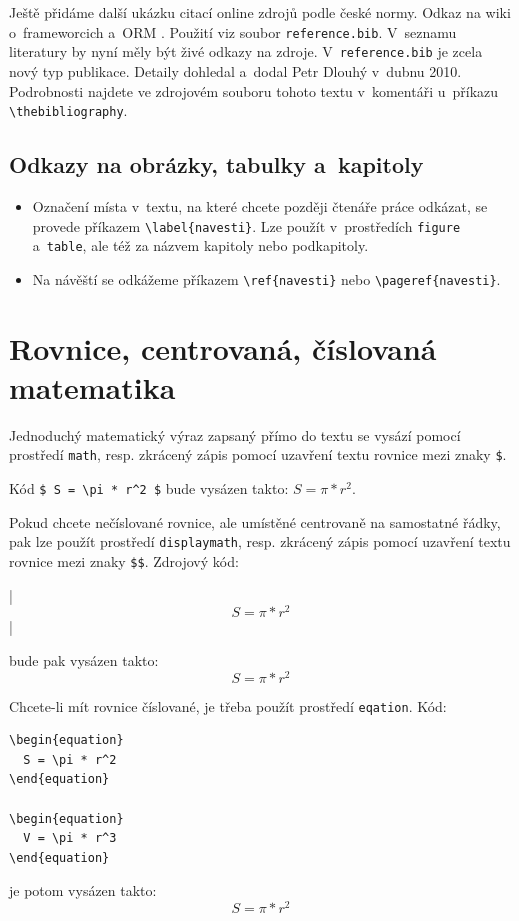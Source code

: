 \documentclass[11pt,twoside,a4paper]{book}
\begin{document}
Ještě přidáme další ukázku citací online zdrojů podle české normy. Odkaz na wiki o~frameworcich \cite{wiki:framework}
a~ORM \cite{wiki:orm}. Použití viz soubor \verb|reference.bib|. V~seznamu literatury by nyní měly být živé odkazy na
zdroje. V~\verb|reference.bib| je zcela nový typ publikace. Detaily dohledal a~dodal Petr Dlouhý v~dubnu 2010.
Podrobnosti najdete ve zdrojovém souboru tohoto textu v~komentáři u~příkazu \verb|\thebibliography|.

\subsection{Odkazy na obrázky, tabulky a~kapitoly}
\begin{itemize}
\item Označení místa v~textu, na které chcete později čtenáře práce odkázat, se provede příkazem \verb|\label{navesti}|.
Lze použít v~prostředích \verb|figure| a~\verb|table|, ale též za názvem kapitoly nebo podkapitoly.
\item Na návěští se odkážeme příkazem \verb|\ref{navesti}| nebo \verb|\pageref{navesti}|.
\end{itemize}

\section{Rovnice, centrovaná, číslovaná matematika}
Jednoduchý matematický výraz zapsaný přímo do textu se vysází pomocí prostředí \verb|math|, resp. zkrácený zápis pomocí
uzavření textu rovnice mezi znaky \verb|$|.

Kód \verb|$ S = \pi * r^2 $| bude vysázen takto: $ S = \pi * r^2 $.

Pokud chcete nečíslované rovnice, ale umístěné centrovaně na samostatné řádky, pak lze použít prostředí
\verb|displaymath|, resp. zkrácený zápis pomocí uzavření textu rovnice mezi znaky \verb|$$|. Zdrojový kód: 
\begin{verb}
|$$ S = \pi * r^2 $$|
\end{verb}
bude pak vysázen takto:
$$ S = \pi * r^2 $$

Chcete-li mít rovnice číslované, je třeba použít prostředí \verb|eqation|. Kód:
\begin{verbatim}
\begin{equation}
  S = \pi * r^2
\end{equation}

\begin{equation}
  V = \pi * r^3
\end{equation}
\end{verbatim}
je potom vysázen takto:
\begin{equation}
  S = \pi * r^2
\end{equation}
\end{document}
